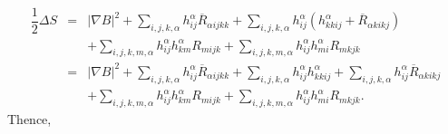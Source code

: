 \documentclass[leqno,11pt]{amsart}
\theoremstyle{plain}
\theoremstyle{definition}
\numberwithin{equation}{section}
\begin{document}
\begin{eqnarray*}
\dfrac{1}{2}\Delta S&=&|\nabla B|^2+\sum_{i,j,k,\alpha}h_{ij}^{\alpha}\overline{R}_{\alpha ijkk}+\sum_{i,j,k,\alpha}h_{ij}^{\alpha}\left(h_{kkij}^{\alpha}+\overline{R}_{\alpha kikj}\right)\\
&&+\sum_{i,j,k,m,\alpha}h_{ij}^{\alpha}h_{km}^{\alpha}R_{mijk}+\sum_{i,j,k,m,\alpha}h_{ij}^{\alpha}h_{mi}^{\alpha}R_{mkjk} \\
&=&|\nabla B|^2+\sum_{i,j,k,\alpha}h_{ij}^{\alpha}\overline{R}_{\alpha ijkk}+\sum_{i,j,k,\alpha}h_{ij}^{\alpha}h_{kkij}^{\alpha}+\sum_{i,j,k,\alpha}h_{ij}^{\alpha}\overline{R}_{\alpha kikj} \\
&&+\sum_{i,j,k,m,\alpha}h_{ij}^{\alpha}h_{km}^{\alpha}R_{mijk}+\sum_{i,j,k,m,\alpha}h_{ij}^{\alpha}h_{mi}^{\alpha}R_{mkjk}.
\end{eqnarray*}
Thence,
\end{document}
